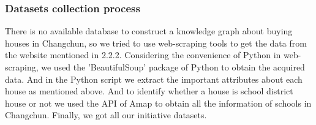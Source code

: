     
\subsubsection{Datasets collection process}
There is no available database to construct a knowledge graph about buying houses in Changchun, so we tried to use web-scraping tools to get the data from the website mentioned in 2.2.2. Considering the convenience of Python in web-scraping, we used the 'BeautifulSoup' package of Python to obtain the acquired data. And in the Python script we extract the important attributes about each house as mentioned above. And to identify whether a house is school district house or not we used the API of Amap to obtain all the information of schools in Changchun. Finally, we got all our initiative datasets.

